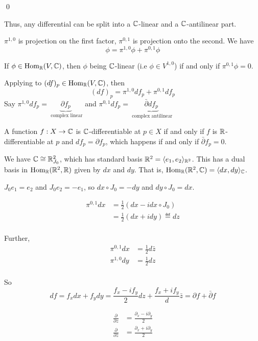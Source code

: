 \documentclass[x11names,reqno,14pt]{extarticle}
\begin{document}
\qed

Thus, any differential can be split into a $\mathbb{C}$-linear and a $\mathbb{C}$-antilinear part. 


$\pi^{1, 0}$ is projection on the first factor, $\pi^{0, 1}$ is projection onto the second. We have
\[
\phi = \pi^{1, 0}\phi + \pi^{0, 1}\phi
\]

\cor

If $\phi \in {\mathrm{Hom}}_{\mathbb{R}}(V,\mathbb{C})$, then $\phi$ being $\mathbb{C}$-linear (i.e $\phi \in V^{1, 0}$) if and only if $\pi^{0, 1}\phi = 0$. 


Applying to $(df)_p \in {\mathrm{Hom}}_{\mathbb{R}}(V, \mathbb{C})$, then 
\[
(df)_p = \pi^{1, 0}df_p + \pi^{0, 1}df_p
\]
Say $\pi^{1, 0}df_p = \underbrace{\partial f_p}_{\text{ complex linear}}$ and $\pi^{0, 1}df_p = \underbrace{\bar{\partial}df_p}_{\text{ complex antilinear}}$

\thm A function $f:X\to\mathbb{C}$ is $\mathbb{C}$-differentiable at $p \in X$ if and only if $f$ is $\mathbb{R}$-differentiable at $p$ and $df_p = \partial f_p$, which happens if and only if $\bar{\partial}f_p = 0$. 

\proof

We have $\mathbb{C} \cong \mathbb{R}^2_{J_0}$, which has standard basis $\mathbb{R}^2 = \langle e_1, e_2\rangle_{\mathbb{R}^2}$. This has a dual basis in ${\mathrm{Hom}}_{\mathbb{R}}(\mathbb{R}^2, \mathbb{R})$ given by $dx$ and $dy$. That is, ${\mathrm{Hom}}_{\mathbb{R}}(\mathbb{R}^2, \mathbb{C}) = \langle dx, dy \rangle_{\mathbb{C}}$. 

$J_0e_1 = e_2$ and $J_0e_2 = -e_1$, so $dx \circ J_0 = -dy$ and $dy \circ J_0 = dx$. 

\begin{align*}
\pi^{0, 1}dx & =\frac{1}{2}(dx - idx\circ J_0)\\
				 & = \frac{1}{2}(dx + idy) \eqdef dz \\
\end{align*}

Further, 
\begin{align*}
\pi^{0, 1}dx & = \frac{1}{2}d\bar{z} \\
\pi^{1, 0}dy & = \frac{1}{2}dz \\
\end{align*}

So 
\[
df = f_xdx + f_ydy = \frac{f_x - if_y}{2}dz + \frac{f_x + if_y}d\bar{z} = \partial f + \bar{\partial} f
\]


\begin{align*}
\frac{\partial}{\partial z} & = \frac{\partial_x - i\partial_y}{2} \\
\frac{\partial}{\partial \bar{z}} & = \frac{\partial_x + i\partial_y}{2} \\
\end{align*}
\end{document}
